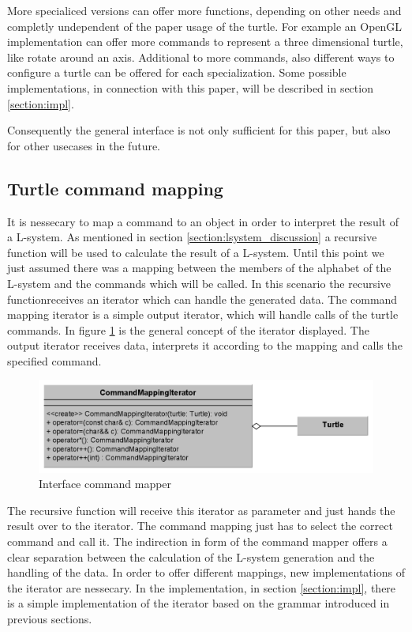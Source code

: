 \documentclass[english]{cpp-hmwk}
\begin{document}
\medskip
\noindent More specialiced versions can offer more functions, depending on other needs and completly undependent of the paper usage of the turtle. For example an OpenGL implementation can offer more commands to represent a three dimensional turtle, like rotate around an axis. Additional to more commands, also different ways to configure a turtle can be offered for each specialization. Some possible implementations, in connection with this paper, will be described in section \ref{section:impl}.

Consequently the general interface is not only sufficient for this paper, but also for other usecases in the future.

\subsection{Turtle command mapping}
\label{section:turtle_mapping}
It is nessecary to map a command to an object in order to interpret the result of a L-system. As mentioned in section \ref{section:lsystem_discussion} a recursive function will be used to calculate the result of a L-system. Until this point we just assumed there was a mapping between the members of the alphabet of the L-system and the commands which will be called. In this scenario the recursive functionreceives an iterator which can handle the generated data. 
The command mapping iterator is a simple output iterator, which will handle calls of the turtle commands. In figure \ref{figure:if_command_map} is the general concept of the iterator displayed. The output iterator receives data, interprets it according to the mapping and calls the specified command.

\begin{figure}[h!]
	\centering
	\includegraphics[width=1\columnwidth]{../graphs/LSystem/examples/class_command_mapping_iterator.png}
	\caption{Interface command mapper}
	\label{figure:if_command_map}
\end{figure}

The recursive function will receive this iterator as parameter and just hands the result over to the iterator. The command mapping just has to select the correct command and call it.
The indirection in form of the command mapper offers a clear separation between the calculation of the L-system generation and the handling of the data. In order to offer different mappings, new implementations of the iterator are nessecary. In the implementation, in section \ref{section:impl}, there is a simple implementation of the iterator based on the grammar introduced in previous sections.
\end{document}
